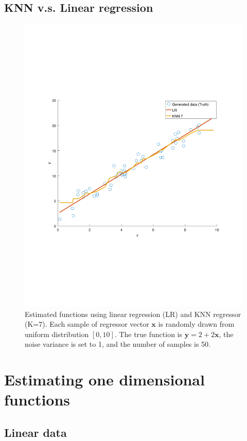 \documentclass[]{article}
\begin{document}
\subsection{KNN v.s. Linear regression}
\begin{figure}[ht]
	\centering
	\includegraphics[trim= 10cm 5cm 10cm 5cm, scale=0.4]{proj1-2c}
	\caption{Estimated functions using linear regression (LR) and KNN regressor (K=7). Each sample of regressor vector $\mathbf{x}$ is randomly drawn from uniform distribution $[0,10]$. The true function is $\mathbf{y}=2+2\mathbf{x}$, the noise variance is set to 1, and the number of samples is 50.}
	\label{fig:KNNvsLR}
\end{figure}

\newpage
\section{Estimating one dimensional functions}

\subsection{Linear data}
\end{document}
